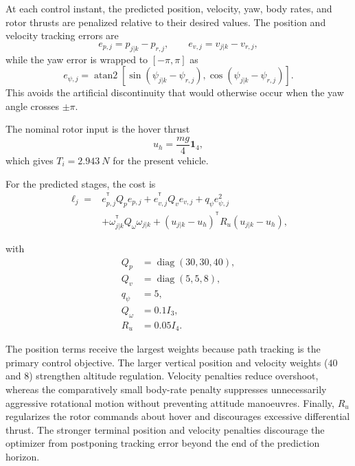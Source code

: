 \documentclass[conference]{IEEEtran}
\newcommand{\T}{^{\mathsf T}}
\newcommand{\diag}{\operatorname{diag}}
\begin{document}
At each control instant, the predicted position, velocity, yaw, body rates, and rotor thrusts are penalized relative to their desired values. The position and velocity tracking errors are
\begin{equation}
e_{p,j}=p_{j|k}-p_{r,j},\qquad
e_{v,j}=v_{j|k}-v_{r,j},
\end{equation}
while the yaw error is wrapped to $[-\pi,\pi]$ as
\begin{equation}
e_{\psi,j}
=
\operatorname{atan2}
\left[
\sin(\psi_{j|k}-\psi_{r,j}),
\cos(\psi_{j|k}-\psi_{r,j})
\right].
\label{eq:yawerror}
\end{equation}
This avoids the artificial discontinuity that would otherwise occur
when the yaw angle crosses $\pm\pi$.

The nominal rotor input is the hover thrust
\begin{equation}
u_h=\frac{mg}{4}\mathbf{1}_4,
\end{equation}
which gives $T_i=\SI{2.943}{N}$ for the present vehicle.

For the predicted stages, the cost is
\begin{equation}
\begin{aligned}
\ell_j={}&
e_{p,j}^{\T}Q_pe_{p,j}
+
e_{v,j}^{\T}Q_ve_{v,j}
+
q_\psi e_{\psi,j}^{2}\\
&+
\omega_{j|k}^{\T}Q_\omega\omega_{j|k}
+
(u_{j|k}-u_h)^{\T}R_u(u_{j|k}-u_h),
\end{aligned}
\label{eq:stagecost}
\end{equation}

with
\begin{equation}
\begin{aligned}
Q_p&=\diag(30,30,40),\\
Q_v&=\diag(5,5,8),\\
q_\psi&=5,\\
Q_\omega&=0.1I_3,\\
R_u&=0.05I_4.
\end{aligned}
\label{eq:nmpcweights}
\end{equation}

The position terms receive the largest weights because path tracking is the primary control objective. The larger vertical position and velocity weights ($40$ and $8$) strengthen altitude regulation. Velocity penalties reduce overshoot, whereas the comparatively small body-rate penalty suppresses unnecessarily aggressive rotational motion without preventing attitude manoeuvres. Finally, $R_u$ regularizes the rotor commands about hover and discourages excessive differential thrust. The stronger terminal position and velocity penalties discourage the optimizer from postponing tracking error beyond the end of the prediction horizon.
\end{document}

